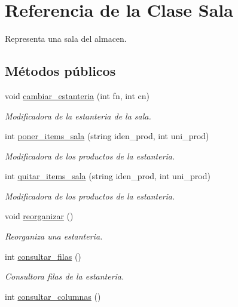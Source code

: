 \hypertarget{class_sala}{}\section{Referencia de la Clase Sala}
\label{class_sala}


Representa una sala del almacen.  


\subsection*{Métodos públicos}
\begin{DoxyCompactItemize}
\item 
void \hyperlink{class_sala_a063378a8c289f9d37c7ba26448aa55f2}{cambiar\+\_\+estanteria} (int fn, int cn)
\begin{DoxyCompactList}\small\item\em Modificadora de la estanteria de la sala. \end{DoxyCompactList}\item 
int \hyperlink{class_sala_a378d6236451ef046231ab85c03de309f}{poner\+\_\+items\+\_\+sala} (string iden\+\_\+prod, int uni\+\_\+prod)
\begin{DoxyCompactList}\small\item\em Modificadora de los productos de la estanteria. \end{DoxyCompactList}\item 
int \hyperlink{class_sala_af099ecd547afeb3a34fc75639372f330}{quitar\+\_\+items\+\_\+sala} (string iden\+\_\+prod, int uni\+\_\+prod)
\begin{DoxyCompactList}\small\item\em Modificadora de los productos de la estanteria. \end{DoxyCompactList}\item 
void \hyperlink{class_sala_aaac8d848595b493ea08516f2101b829e}{reorganizar} ()
\begin{DoxyCompactList}\small\item\em Reorganiza una estanteria. \end{DoxyCompactList}\item 
int \hyperlink{class_sala_a71a568ec948b6a417a055f1e5fba6836}{consultar\+\_\+filas} ()
\begin{DoxyCompactList}\small\item\em Consultora filas de la estanteria. \end{DoxyCompactList}\item 
int \hyperlink{class_sala_a5ddf08fd6cb6fc2af9b9b230026d01d4}{consultar\+\_\+columnas} ()

\end{DoxyCompactItemize}

